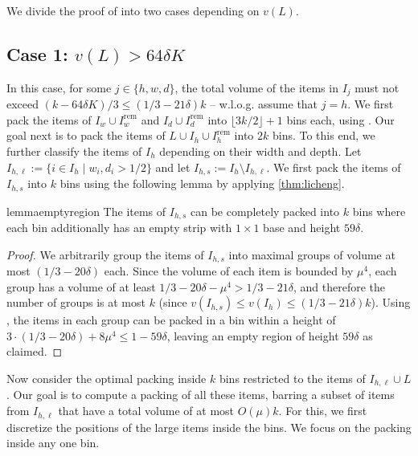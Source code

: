 \documentclass[a4paper,UKenglish,cleveref, autoref, thm-restate]{lipics-v2021}
\begin{document}
We divide the proof of  into two cases depending on $v(L)$.



\subsection{Case 1: \texorpdfstring{$v(L) > 64\delta K$}{large volume of L}}
In this case, for some $j\in \{h,w,d\}$, the total volume of the items in $I_{j}$ must not exceed $(k-64\delta K)/3 \le (1/3 - 21\delta)k$ -- w.l.o.g. assume that $j=h$. We first pack the items of $I_w \cup I^{\text{rem}}_w$ and $I_d \cup I^{\text{rem}}_d$ into $\lfloor 3k/2\rfloor +1$ bins each,  using . Our goal next is to pack the items of $L \cup I_h \cup I^{\text{rem}}_h$ into $2k$ bins.
To this end, we further classify the items of $I_h$ depending on their width and depth. Let $I_{h,\ell} := \{i\in I_h \mid w_i, d_i > 1/2\}$ and let $I_{h,s}:= I_h \setminus I_{h,\ell}$. We first pack the items of $I_{h,s}$ into $k$ bins using the following lemma by applying \cref{thm:licheng}.



\begin{restatable}{lemma}{emptyregion}
\label{lem:emptyregion}
    The items of $I_{h,s}$ can be completely packed into $k$ bins where each bin additionally has an empty strip with $1\times 1$ base and height $59\delta$.
\end{restatable}
\begin{proof}
    We arbitrarily group the items of $I_{h,s}$ into maximal groups of volume at most $(1/3-20\delta)$ each. Since the volume of each item is bounded by $\mu^4$, each group has a volume of at least $1/3-20\delta-\mu^4 > 1/3-21\delta$, and therefore the number of groups is at most $k$ (since $v(I_{h,s})\le v(I_h)\le (1/3-21\delta)k$). Using , the items in each group can be packed in a bin within a height of $3\cdot (1/3-20\delta)+8\mu^4 \le 1-59\delta$, leaving an empty region of height $59\delta$ as claimed.
\end{proof}


Now consider the optimal packing inside $k$ bins restricted to the items of $I_{h,\ell}\cup L$. Our goal is to compute a packing of all these items, barring a subset of items from $I_{h,\ell}$ that have a total volume of at most $O(\mu)k$. 
For this, we first discretize the positions of the large items inside the bins. We focus on the packing inside any one bin.
\end{document}
